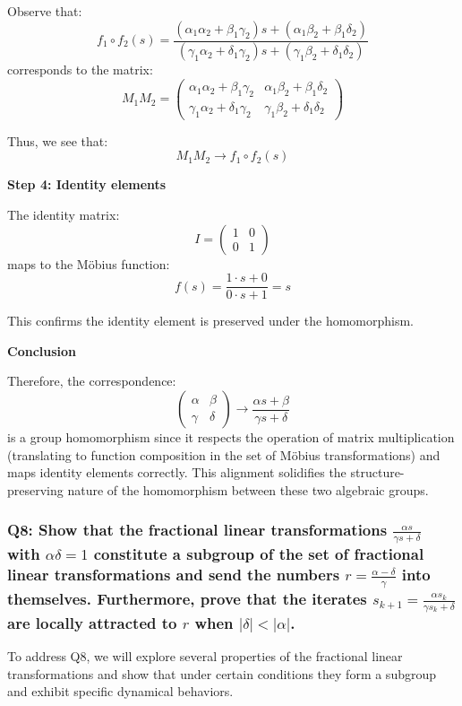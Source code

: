 \documentclass[8pt]{article}
\begin{document}
Observe that:
\[ f_1 \circ f_2(s) = \frac{(\alpha_1\alpha_2 + \beta_1\gamma_2)s + (\alpha_1\beta_2 + \beta_1\delta_2)}{(\gamma_1\alpha_2 + \delta_1\gamma_2)s + (\gamma_1\beta_2 + \delta_1\delta_2)} \]
corresponds to the matrix:
\[ M_1 M_2 = \begin{pmatrix} \alpha_1\alpha_2 + \beta_1\gamma_2 & \alpha_1\beta_2 + \beta_1\delta_2 \\ \gamma_1\alpha_2 + \delta_1\gamma_2 & \gamma_1\beta_2 + \delta_1\delta_2 \end{pmatrix} \]

Thus, we see that:
\[ M_1 M_2 \longrightarrow f_1 \circ f_2(s) \]

\textbf{Step 4: Identity elements}

The identity matrix:
\[ I = \begin{pmatrix} 1 & 0 \\ 0 & 1 \end{pmatrix} \]
maps to the Möbius function:
\[ f(s) = \frac{1 \cdot s + 0}{0 \cdot s + 1} = s \]

This confirms the identity element is preserved under the homomorphism.

\textbf{Conclusion}

Therefore, the correspondence:
\[ \begin{pmatrix} \alpha & \beta \\ \gamma & \delta \end{pmatrix} \longrightarrow \frac{\alpha s + \beta}{\gamma s + \delta} \]
is a group homomorphism since it respects the operation of matrix multiplication (translating to function composition in the set of Möbius transformations) and maps identity elements correctly. This alignment solidifies the structure-preserving nature of the homomorphism between these two algebraic groups.

\subsubsection*{Q8: Show that the fractional linear transformations \( \frac{\alpha s}{\gamma s + \delta} \) with \( \alpha \delta = 1 \) constitute a subgroup of the set of fractional linear transformations and send the numbers \( r = \frac{\alpha - \delta}{\gamma} \) into themselves. Furthermore, prove that the iterates \( s_{k+1} = \frac{\alpha s_k}{\gamma s_k + \delta} \) are locally attracted to \( r \) when \( |\delta| < |\alpha| \).}

To address Q8, we will explore several properties of the fractional linear transformations and show that under certain conditions they form a subgroup and exhibit specific dynamical behaviors.
\end{document}
